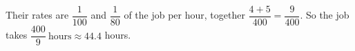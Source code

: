 Their rates are $\dfrac{1}{100}$ and $\dfrac{1}{80}$ of the job per hour, together $\dfrac{4+5}{400}=\dfrac{9}{400}$. So the job takes $\boxed{\dfrac{400}{9}\ \text{hours}}\approx44.4$ hours.
